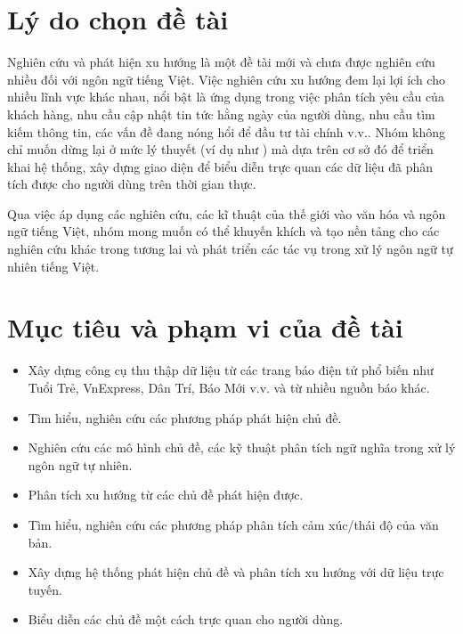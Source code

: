 \section{Lý do chọn đề tài}
Nghiên cứu và phát hiện xu hướng là một đề tài mới và chưa được nghiên cứu nhiều đối với ngôn ngữ tiếng Việt. Việc nghiên cứu xu hướng đem lại lợi ích cho nhiều lĩnh vực khác nhau, nổi bật là ứng dụng trong việc phân tích yêu cầu của khách hàng, nhu cầu cập nhật tin tức hằng ngày của người dùng, nhu cầu tìm kiếm thông tin, các vấn đề đang nóng hổi để đầu tư tài chính v.v.. Nhóm không chỉ muốn dừng lại ở mức lý thuyết (ví dụ như \cite{dinhImprovingSocialTrend2021}) mà dựa trên cơ sở đó để triển khai hệ thống, xây dựng giao diện để biểu diễn trực quan các dữ liệu đã phân tích được cho người dùng trên thời gian thực.

Qua việc áp dụng các nghiên cứu, các kĩ thuật của thế giới vào văn hóa và ngôn ngữ tiếng Việt, nhóm mong muốn có thể khuyến khích và tạo nền tảng cho các nghiên cứu khác trong tương lai và phát triển các tác vụ trong xử lý ngôn ngữ tự nhiên tiếng Việt.

\section{Mục tiêu và phạm vi của đề tài}
\begin{itemize}
    \item Xây dựng công cụ thu thập dữ liệu từ các trang báo điện tử phổ biến như Tuổi Trẻ, VnExpress, Dân Trí, Báo Mới v.v. và từ nhiều nguồn báo khác.
    \item Tìm hiểu, nghiên cứu các phương pháp phát hiện chủ đề.
    \item Nghiên cứu các mô hình chủ đề, các kỹ thuật phân tích ngữ nghĩa trong xử lý ngôn ngữ tự nhiên.
    \item Phân tích xu hướng từ các chủ đề phát hiện được.
    \item Tìm hiểu, nghiên cứu các phương pháp phân tích cảm xúc/thái độ của văn bản.
    \item Xây dựng hệ thống phát hiện chủ đề và phân tích xu hướng với dữ liệu trực tuyến.
    \item Biểu diễn các chủ đề một cách trực quan cho người dùng.
\end{itemize}

